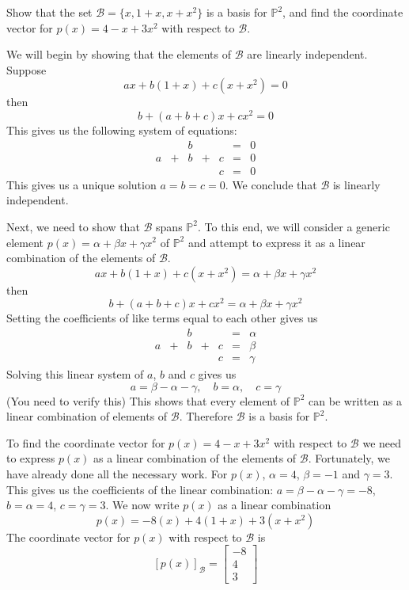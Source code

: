 \documentclass{ximera}
\begin{document}
\begin{example}
Show that the set $\mathcal{B}=\{x, 1+x, x+x^2\}$ is a basis for $\mathbb{P}^2$, and find the coordinate vector for $p(x)=4-x+3x^2$ with respect to $\mathcal{B}$.
\begin{explanation}
We will begin by showing that the elements of $\mathcal{B}$ are linearly independent.  Suppose 
$$ax+b(1+x)+c(x+x^2)=0$$
then
$$b+(a+b+c)x+cx^2=0$$
This gives us the following system of equations:
$$\begin{array}{ccccccc}
     & &b&&&=&0\\
     a & +&b&+&c&= &0 \\
	 & &&&c&=&0
     \end{array}$$
This gives us a unique solution $a=b=c=0$.  We conclude that $\mathcal{B}$ is linearly independent.

Next, we need to show that $\mathcal{B}$ spans $\mathbb{P}^2$.  To this end, we will consider a generic element $p(x)=\alpha+\beta x+\gamma x^2$ of $\mathbb{P}^2$ and attempt to express it as a linear combination of the elements of $\mathcal{B}$.
$$ax+b(1+x)+c(x+x^2)=\alpha+\beta x+\gamma x^2$$
then
$$b+(a+b+c)x+cx^2=\alpha+\beta x+\gamma x^2$$
Setting the coefficients of like terms equal to each other gives us
$$\begin{array}{ccccccc}
     & &b&&&=&\alpha\\
     a & +&b&+&c&= &\beta \\
	 & &&&c&=&\gamma
     \end{array}$$
Solving this linear system of $a$, $b$ and $c$ gives us
$$a=\beta-\alpha-\gamma,\quad b=\alpha,\quad c=\gamma$$
(You need to verify this)  This shows that every element of $\mathbb{P}^2$ can be written as a linear combination of elements of $\mathcal{B}$.  Therefore $\mathcal{B}$ is a basis for $\mathbb{P}^2$.

To find the coordinate vector for $p(x)=4-x+3x^2$ with respect to $\mathcal{B}$ we need to express $p(x)$ as a linear combination of the elements of $\mathcal{B}$.  Fortunately, we have already done all the necessary work.  For $p(x)$, $\alpha=4$, $\beta=-1$ and $\gamma=3$.  This gives us the coefficients of the linear combination: $a=\beta-\alpha-\gamma=-8$, $b=\alpha=4$, $c=\gamma=3$.  We now write $p(x)$ as a linear combination
$$p(x)=-8(x)+4(1+x)+3(x+x^2)$$
The coordinate vector for $p(x)$ with respect to $\mathcal{B}$ is
$$[p(x)]_{\mathcal{B}}=\begin{bmatrix}-8\\4\\3\end{bmatrix}$$
\end{explanation}
\end{example}
\end{document}
